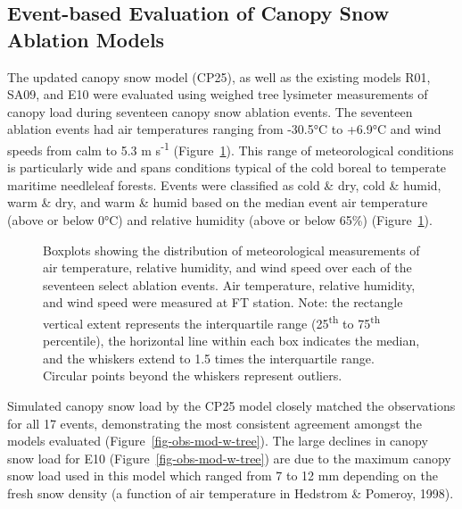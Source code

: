 \documentclass[
]{agujournal2019}
\begin{document}
\subsection{Event-based Evaluation of Canopy Snow Ablation
Models}\label{event-based-evaluation-of-canopy-snow-ablation-models}

The updated canopy snow model (CP25), as well as the existing models
R01, SA09, and E10 were evaluated using weighed tree lysimeter
measurements of canopy load during seventeen canopy snow ablation
events. The seventeen ablation events had air temperatures ranging from
-30.5°C to +6.9°C and wind speeds from calm to 5.3 m
s\textsuperscript{-1} (Figure~\ref{fig-event-met-boxplot}). This range
of meteorological conditions is particularly wide and spans conditions
typical of the cold boreal to temperate maritime needleleaf forests.
Events were classified as cold \& dry, cold \& humid, warm \& dry, and
warm \& humid based on the median event air temperature (above or below
0°C) and relative humidity (above or below 65\%)
(Figure~\ref{fig-event-met-boxplot}).

\begin{figure}[htbp]


\caption{\label{fig-event-met-boxplot}Boxplots showing the distribution
of meteorological measurements of air temperature, relative humidity,
and wind speed over each of the seventeen select ablation events. Air
temperature, relative humidity, and wind speed were measured at FT
station. Note: the rectangle vertical extent represents the
interquartile range (25\textsuperscript{th} to 75\textsuperscript{th}
percentile), the horizontal line within each box indicates the median,
and the whiskers extend to 1.5 times the interquartile range. Circular
points beyond the whiskers represent outliers.}

\end{figure}%

Simulated canopy snow load by the CP25 model closely matched the
observations for all 17 events, demonstrating the most consistent
agreement amongst the models evaluated
(Figure~\ref{fig-obs-mod-w-tree}). The large declines in canopy snow
load for E10 (Figure~\ref{fig-obs-mod-w-tree}) are due to the maximum
canopy snow load used in this model which ranged from 7 to 12 mm
depending on the fresh snow density (a function of air temperature in
Hedstrom \& Pomeroy, 1998).
\end{document}
